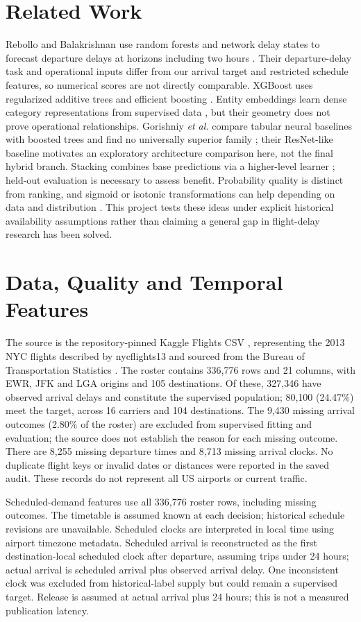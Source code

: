 \documentclass[conference]{IEEEtran}
\begin{document}
\section{Related Work}
Rebollo and Balakrishnan use random forests and network delay states to forecast departure delays at horizons including two hours \cite{rebollo}. Their departure-delay task and operational inputs differ from our arrival target and restricted schedule features, so numerical scores are not directly comparable. XGBoost uses regularized additive trees and efficient boosting \cite{xgboost}. Entity embeddings learn dense category representations from supervised data \cite{embedding}, but their geometry does not prove operational relationships. Gorishniy \emph{et al.} compare tabular neural baselines with boosted trees and find no universally superior family \cite{tabular}; their ResNet-like baseline motivates an exploratory architecture comparison here, not the final hybrid branch. Stacking combines base predictions via a higher-level learner \cite{stacking}; held-out evaluation is necessary to assess benefit. Probability quality is distinct from ranking, and sigmoid or isotonic transformations can help depending on data and distribution \cite{calibration}. This project tests these ideas under explicit historical availability assumptions rather than claiming a general gap in flight-delay research has been solved.
\section{Data, Quality and Temporal Features}
The source is the repository-pinned Kaggle Flights CSV \cite{kaggle}, representing the 2013 NYC flights described by nycflights13 and sourced from the Bureau of Transportation Statistics \cite{nyc}. The roster contains 336,776 rows and 21 columns, with EWR, JFK and LGA origins and 105 destinations. Of these, 327,346 have observed arrival delays and constitute the supervised population; 80,100 (24.47\%) meet the target, across 16 carriers and 104 destinations. The 9,430 missing arrival outcomes (2.80\% of the roster) are excluded from supervised fitting and evaluation; the source does not establish the reason for each missing outcome. There are 8,255 missing departure times and 8,713 missing arrival clocks. No duplicate flight keys or invalid dates or distances were reported in the saved audit. These records do not represent all US airports or current traffic.

Scheduled-demand features use all 336,776 roster rows, including missing outcomes. The timetable is assumed known at each decision; historical schedule revisions are unavailable. Scheduled clocks are interpreted in local time using airport timezone metadata. Scheduled arrival is reconstructed as the first destination-local scheduled clock after departure, assuming trips under 24 hours; actual arrival is scheduled arrival plus observed arrival delay. One inconsistent clock was excluded from historical-label supply but could remain a supervised target. Release is assumed at actual arrival plus 24 hours; this is not a measured publication latency.
\end{document}
